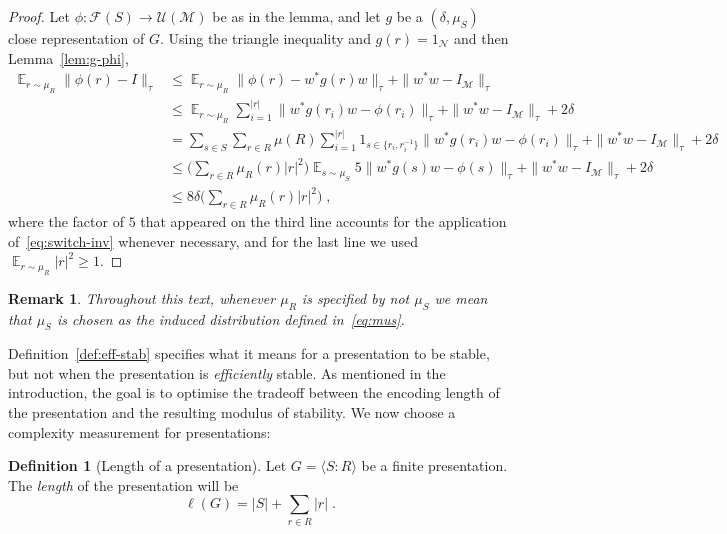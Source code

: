 \documentclass[11pt]{article}
\newtheorem{remark}[theorem]{Remark}
\theoremstyle{definition}
\newtheorem{definition}[theorem]{Definition}
\newcommand{\Id}{\ensuremath{I}}
\DeclareMathOperator*{\Expectation}{\mathbb{E}}
\newcommand{\Es}[1]{\Expectation_{#1}}
\newcommand{\mM}{\ensuremath{\mathcal{M}}}
\newcommand{\cM}{\ensuremath{\mathcal{M}}}
\newcommand{\mN}{\mathcal{N}}
\begin{document}
  \begin{proof}
    Let $\phi:\mathcal{F}(S)\to \mathcal{U}(\cM)$ be as in the lemma, and let $g$ be a $(\delta,\mu_S)$ close representation of $G$.
   Using the triangle inequality and $g(r)=1_\mN$ and then Lemma~\ref{lem:g-phi}, 
  \begin{align*}
  \Es{r\sim \mu_R}\|\phi(r)-\Id\|_\tau &\leq \Es{r\sim \mu_R}\|\phi(r)-w^*g(r)w\|_\tau + \|w^*w-I_\mM\|_\tau\\
  &\leq \Es{r\sim \mu_R}\sum_{i=1}^{|r|}\| w^* g(r_i)w -\phi(r_i)\|_\tau + \|w^*w-I_\mM\|_\tau +2\delta \\
  &=  \sum_{s\in S} \sum_{r\in R} \mu(R) \sum_{i=1}^{|r|} 1_{s\in \{r_i,r_i^{-1}\}} \| w^* g(r_i)w -\phi(r_i)\|_\tau +   \|w^*w-I_\mM\|_\tau +2\delta\\
  &\leq \Big(\sum_{r\in R} \mu_R(r)|r|^2\Big)\Es{s\sim \mu_S }5 \| w^* g(s)w -\phi(s)\|_\tau +    \|w^*w-I_\mM\|_\tau +2\delta\\
  &\leq 8\delta \Big(\sum_{r\in R} \mu_R(r)|r|^2\Big)\;,
  \end{align*}
  where the factor of $5$ that appeared on the third line accounts for the application of~\eqref{eq:switch-inv} whenever necessary, and for the last line we used $\Es{r\sim \mu_R}|r|^2\geq 1$. 
  \end{proof}
  
\begin{remark}\label{rk-mus}
  Throughout this text, whenever $\mu_R$ is specified by not $\mu_S$ we mean that $\mu_S$ is chosen as the induced distribution defined in~\eqref{eq:mus}.
\end{remark}

Definition~\ref{def:eff-stab} specifies what it means for a presentation to be stable, but not when the presentation is \emph{efficiently} stable. 
As mentioned in the introduction, the goal is to optimise the tradeoff between the encoding length of the presentation and the resulting modulus of stability. We now choose a complexity measurement for presentations:
\begin{definition}[Length of a presentation]\label{def:length_of_pres}
    Let $G=\langle S\colon R\rangle$ be a finite presentation. The \emph{length} of the presentation  will be  $$\ell(G)=|S|+ \sum_{r\in R}|r|\;.$$ 
\end{definition}
\end{document}
